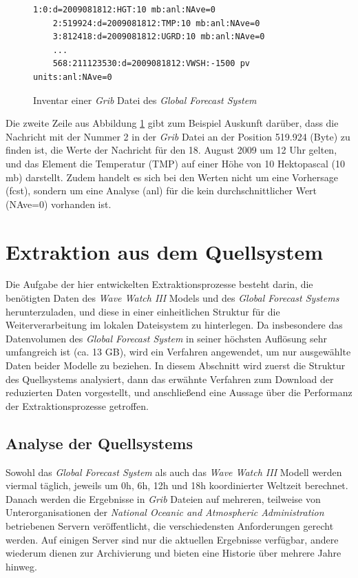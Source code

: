 \begin{figure}[h]
  \begin{Verbatim}[frame=lines,framerule=0.5pt,framesep=3mm]
    1:0:d=2009081812:HGT:10 mb:anl:NAve=0
    2:519924:d=2009081812:TMP:10 mb:anl:NAve=0
    3:812418:d=2009081812:UGRD:10 mb:anl:NAve=0
    ...
    568:211123530:d=2009081812:VWSH:-1500 pv units:anl:NAve=0
  \end{Verbatim}
  \caption{Inventar einer \textit{Grib} Datei des \textit{Global
      Forecast System} }
  \label{abbildung:inventar}
\end{figure}

Die zweite Zeile aus Abbildung \ref{abbildung:inventar} gibt zum
Beispiel Auskunft darüber, dass die Nachricht mit der Nummer 2 in der
\textit{Grib} Datei an der Position 519.924 (Byte) zu finden ist, die
Werte der Nachricht für den 18. August 2009 um 12 Uhr gelten, und das
Element die Temperatur (TMP) auf einer Höhe von 10 Hektopascal (10 mb)
darstellt. Zudem handelt es sich bei den Werten nicht um eine
Vorhersage (fcst), sondern um eine Analyse (anl) für die kein
durchschnittlicher Wert (NAve=0) vorhanden ist.

\section{Extraktion aus dem Quellsystem}

Die Aufgabe der hier entwickelten Extraktionsprozesse besteht darin,
die benötigten Daten des \textit{Wave Watch III} Models und des
\textit{Global Forecast Systems} herunterzuladen, und diese in einer
einheitlichen Struktur für die Weiterverarbeitung im lokalen
Dateisystem zu hinterlegen. Da insbesondere das Datenvolumen des
\textit{Global Forecast System} in seiner höchsten Auflösung sehr
umfangreich ist (ca. 13 GB), wird ein Verfahren angewendet, um nur
ausgewählte Daten beider Modelle zu beziehen. In diesem Abschnitt wird
zuerst die Struktur des Quellsystems analysiert, dann das erwähnte
Verfahren zum Download der reduzierten Daten vorgestellt, und
anschließend eine Aussage über die Performanz der Extraktionsprozesse
getroffen.

\subsection{Analyse der Quellsystems}

Sowohl das \textit{Global Forecast System} als auch das \textit{Wave
  Watch III} Modell werden viermal täglich, jeweils um 0h, 6h, 12h und
18h koordinierter Weltzeit berechnet. Danach werden die Ergebnisse in
\textit{Grib} Dateien auf mehreren, teilweise von Unterorganisationen
der \textit{National Oceanic and Atmospheric Administration}
betriebenen Servern veröffentlicht, die verschiedensten Anforderungen
gerecht werden. Auf einigen Server sind nur die aktuellen Ergebnisse
verfügbar, andere wiederum dienen zur Archivierung und bieten eine
Historie über mehrere Jahre hinweg.

